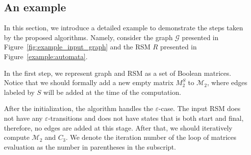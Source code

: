 \subsection{An example}
\label{example:section}
In this section, we introduce a detailed example to demonstrate the steps taken by the proposed algorithms.
Namely, consider the graph $\mathcal{G}$ presented in Figure~\ref{fig:example_input_graph} and the RSM $R$ presented in Figure~\ref{example:automata}.

In the first step, we represent graph and RSM as a set of Boolean matrices.
Notice that we should formally add a new empty matrix $M_2^{S}$ to $\mathcal{M}_2$,
where edges labeled by $S$ will be added at the time of the computation.

After the initialization, the algorithm handles the $\varepsilon$-case.
The input RSM does not have any $\varepsilon$-transitions and does not have states
that is both start and final, therefore, no edges are added at this stage.
After that, we should iteratively compute $\mathcal{M}_2$ and $C_3$.
We denote the iteration number of the loop of matrices evaluation as the number in parentheses in the subscript.

